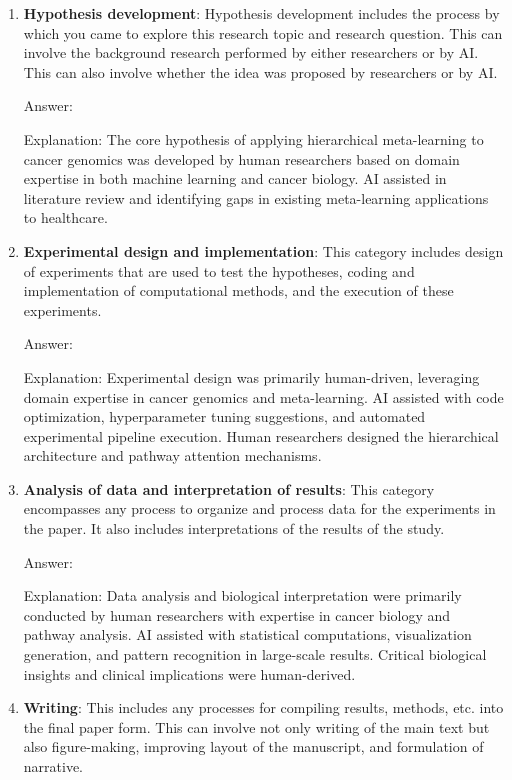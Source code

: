 \documentclass{article}
\begin{document}
\begin{enumerate}
    \item \textbf{Hypothesis development}: Hypothesis development includes the process by which you came to explore this research topic and research question. This can involve the background research performed by either researchers or by AI. This can also involve whether the idea was proposed by researchers or by AI. 

    Answer: \involvementB{} %
    
    Explanation: The core hypothesis of applying hierarchical meta-learning to cancer genomics was developed by human researchers based on domain expertise in both machine learning and cancer biology. AI assisted in literature review and identifying gaps in existing meta-learning applications to healthcare.

    \item \textbf{Experimental design and implementation}: This category includes design of experiments that are used to test the hypotheses, coding and implementation of computational methods, and the execution of these experiments. 

    Answer: \involvementB{} %
    
    Explanation: Experimental design was primarily human-driven, leveraging domain expertise in cancer genomics and meta-learning. AI assisted with code optimization, hyperparameter tuning suggestions, and automated experimental pipeline execution. Human researchers designed the hierarchical architecture and pathway attention mechanisms.

    \item \textbf{Analysis of data and interpretation of results}: This category encompasses any process to organize and process data for the experiments in the paper. It also includes interpretations of the results of the study.
 
    Answer: \involvementB{} %
    
    Explanation: Data analysis and biological interpretation were primarily conducted by human researchers with expertise in cancer biology and pathway analysis. AI assisted with statistical computations, visualization generation, and pattern recognition in large-scale results. Critical biological insights and clinical implications were human-derived.

    \item \textbf{Writing}: This includes any processes for compiling results, methods, etc. into the final paper form. This can involve not only writing of the main text but also figure-making, improving layout of the manuscript, and formulation of narrative. 


\end{enumerate}
\end{document}
